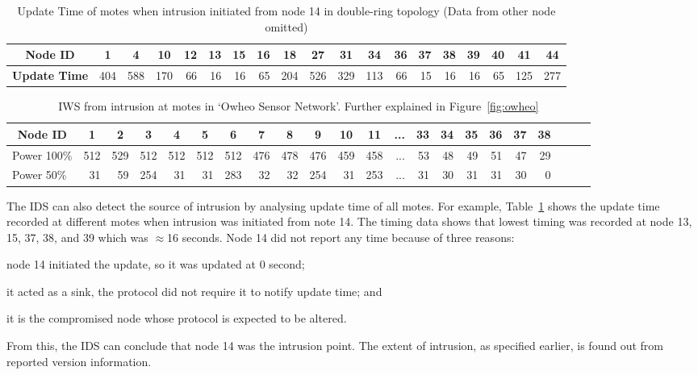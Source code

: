 \documentclass[conference]{IEEEtran}
\newcommand*{\bd}[1]{\multicolumn{1}{|c|}{\bfseries #1}}
\begin{document}
\begin{table}[t]
\centering
\begin{tabular}{|l|*{17}{r|}r|}
\hline
\bd{Node ID}           & \bd{1} & \bd{4} & \bd{10} & \bd{12} & \bd{13} & \bd{15} & \bd{16} & \bd{18} & \bd{27} & \bd{31} & \bd{34} & \bd{36} & \bd{37} & \bd{38} & \bd{39} & \bd{40} & \bd{41} & \bd{44}\\
\hline
\bd{Update Time}  &   404 	&  588 	& 170 	& 66 	& 16 &	 16 	& 65 &	 204 &	 526 & 329 &	 113 &	 66 &	 15 	& 16 	& 16 &	 65 &	125 & 277 \\
\hline
\end{tabular}
\caption{Update Time of motes when intrusion initiated from node 14 in double-ring topology (Data from other node omitted) }
\label{tab:dr_time_14}
\end{table}

\begin{table}[t!]
\centering
\begin{tabular}{|l|*{20}{r|}r|}
\hline
\bd{Node ID}           & \bd{1} & \bd{2} & \bd{3} & \bd{4} & \bd{5} & \bd{6} & \bd{7} & \bd{8} & \bd{9} & \bd{10} & \bd{11} & \bd{...} & \bd{33} & \bd{34} & \bd{35} & \bd{36} & \bd{37} & \bd{38} \\
\hline		\hline

Power 100\%	   & 512 & 529 & 512 & 512 & 512  & 512 & 476 & 478 & 476 & 459 & 458 & ...& 53  & 48 & 49 & 51 & 47 & 29 \\
\hline

Power 50\%	  &31 & 59&254& 31& 31 &283& 32& 32& 254& 31 &253 & ... & 31  & 30 & 31 & 31 & 30 & 0 \\
\hline
\end{tabular}
\caption{IWS from intrusion at motes in `Owheo Sensor Network'. Further explained in Figure~\ref{fig:owheo}}
\label{tab:owheo}
\end{table}


The IDS can also detect the source of intrusion by analysing update time of all motes. %
For example, Table~\ref{tab:dr_time_14} shows the update time recorded at different motes when intrusion was initiated from note 14.
The timing data shows that lowest timing was recorded at node 13, 15, 37, 38, and 39 which was $\approx$16 seconds.
Node 14 did not report any time because of three reasons: 
\begin{inparaenum}
\item node 14 initiated the update, so it was updated at $0$ second;
\item it acted as a sink, the protocol did not require it to notify update time; and 
\item it is the compromised node whose protocol is expected to be altered.
\end{inparaenum}
From this, the IDS can conclude that node 14 was the intrusion point.
The extent of intrusion, as specified earlier, is found out from reported version information.
\end{document}
